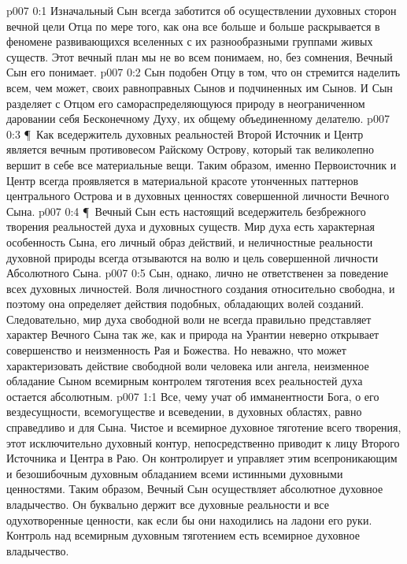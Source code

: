 \author{Божественный Советник}
\vs p007 0:1 Изначальный Сын всегда заботится об осуществлении духовных сторон вечной цели Отца по мере того, как она все больше и больше раскрывается в феномене развивающихся вселенных с их разнообразными группами живых существ. Этот вечный план мы не во всем понимаем, но, без сомнения, Вечный Сын его понимает.
\vs p007 0:2 Сын подобен Отцу в том, что он стремится наделить всем, чем может, своих равноправных Сынов и подчиненных им Сынов. И Сын разделяет с Отцом его самораспределяющуюся природу в неограниченном даровании себя Бесконечному Духу, их общему объединенному делателю.
\vs p007 0:3 \P\ Как вседержитель духовных реальностей Второй Источник и Центр является вечным противовесом Райскому Острову, который так великолепно вершит в себе все материальные вещи. Таким образом, именно Первоисточник и Центр всегда проявляется в материальной красоте утонченных паттернов центрального Острова и в духовных ценностях совершенной личности Вечного Сына.
\vs p007 0:4 \P\ Вечный Сын есть настоящий вседержитель безбрежного творения реальностей духа и духовных существ. Мир духа есть характерная особенность Сына, его личный образ действий, и неличностные реальности духовной природы всегда отзываются на волю и цель совершенной личности Абсолютного Сына.
\vs p007 0:5 Сын, однако, лично не ответственен за поведение всех духовных личностей. Воля личностного создания относительно свободна, и поэтому она определяет действия подобных, обладающих волей созданий. Следовательно, мир духа свободной воли не всегда правильно представляет характер Вечного Сына так же, как и природа на Урантии неверно открывает совершенство и неизменность Рая и Божества. Но неважно, что может характеризовать действие свободной воли человека или ангела, неизменное обладание Сыном всемирным контролем тяготения всех реальностей духа остается абсолютным.
\vs p007 1:1 Все, чему учат об имманентности Бога, о его вездесущности, всемогуществе и всеведении, в духовных областях, равно справедливо и для Сына. Чистое и всемирное духовное тяготение всего творения, этот исключительно духовный контур, непосредственно приводит к лицу Второго Источника и Центра в Раю. Он контролирует и управляет этим всепроникающим и безошибочным духовным обладанием всеми истинными духовными ценностями. Таким образом, Вечный Сын осуществляет абсолютное духовное владычество. Он буквально держит все духовные реальности и все одухотворенные ценности, как если бы они находились на ладони его руки. Контроль над всемирным духовным тяготением есть всемирное духовное владычество.
